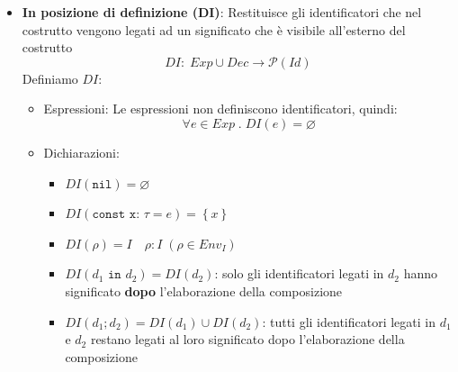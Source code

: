 \documentclass[a4paper]{article}
\begin{document}
\begin{itemize}
  \item \textbf{In posizione di definizione (DI)}: Restituisce gli identificatori
    che nel costrutto vengono legati ad un significato che è visibile all'esterno
    del costrutto
    \[
      DI: \; Exp \cup Dec \to \mathcal{P}(Id)
    \]
    Definiamo \( DI \):
    \begin{itemize}
      \item Espressioni: Le espressioni non definiscono identificatori, quindi:
        \[
          \forall e \in Exp \;.\; DI(e) = \varnothing
        \] 
      \item Dichiarazioni:
        \begin{itemize}
          \item \( DI(\texttt{nil}) = \varnothing \) 
          \item \( DI(\texttt{const x: } \tau = e) = \left\{ x \right\} \) 
          \item \( DI(\rho) = I \quad \rho : I \; (\rho \in Env_I)\)
          \item \( DI(d_1 \texttt{ in } d_2) = DI(d_2) \): solo gli identificatori
            legati in \( d_2 \) hanno significato \textbf{dopo} l'elaborazione della
            composizione
          \item \( DI(d_1; d_2) = DI(d_1) \cup DI(d_2) \): tutti gli identificatori
            legati in \( d_1 \) e \( d_2 \) restano legati al loro significato dopo
            l'elaborazione della composizione
        \end{itemize}
    \end{itemize}
\end{itemize}
\end{document}
